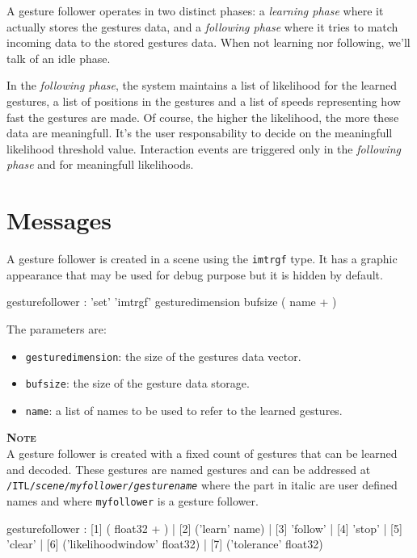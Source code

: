 \documentclass[a4paper,twoside]{report}
\newcommand{\sublevel}[1]	{\section{#1}}
\newcommand{\OSC}[1]		{\texttt{#1}}
\newcommand{\note}	[1]		{\vspace{2mm}\textbf{\hspace{-1.03cm}\textbf{\textsc{Note #1}}}}
\begin{document}
A gesture follower operates in two distinct phases: a \emph{learning phase} where it actually stores the gestures data, and a \emph{following phase} where it tries to match incoming data to the stored gestures data. When not learning nor following, we'll talk of an idle phase. 

In the \emph{following phase}, the system maintains a list of likelihood for the learned gestures, a list of positions in the gestures and a list of speeds representing how fast the gestures are made. Of course, the higher the likelihood, the more these data are meaningfull. It's the user responsability to decide on the meaningfull likelihood threshold value. Interaction events are triggered only in the \emph{following phase} and for meaningfull likelihoods.

\sublevel{Messages}\label{gfmessages}
A gesture follower is created in a scene using the \OSC{imtrgf} type. It has a graphic appearance that may be used for debug purpose but it is hidden by default.

\begin{rail}
gesturefollower : 'set' 'imtrgf' gesturedimension bufsize ( name + )
\end{rail}

The parameters are:
\begin{itemize}
\item \OSC{gesturedimension}: the size of the gestures data vector.
\item \OSC{bufsize}: the size of the gesture data storage.
\item \OSC{name}: a list of names to be used to refer to the learned gestures.
\end{itemize}

\note{} \\
A gesture follower is created with a fixed count of gestures that can be learned and decoded. These gestures are named gestures and can be addressed at \OSC{/ITL/\textit{scene}/\textit{myfollower}/\textit{gesturename}} where the part in italic are user defined names and where \OSC{myfollower} is a gesture follower.


\begin{rail}
gesturefollower :
		  [1] ( float32 + )
		| [2] ('learn' name)
		| [3] 'follow'
		| [4] 'stop'
		| [5] 'clear'
		| [6] ('likelihoodwindow' float32)
		| [7] ('tolerance' float32)
\end{rail}
\end{document}
